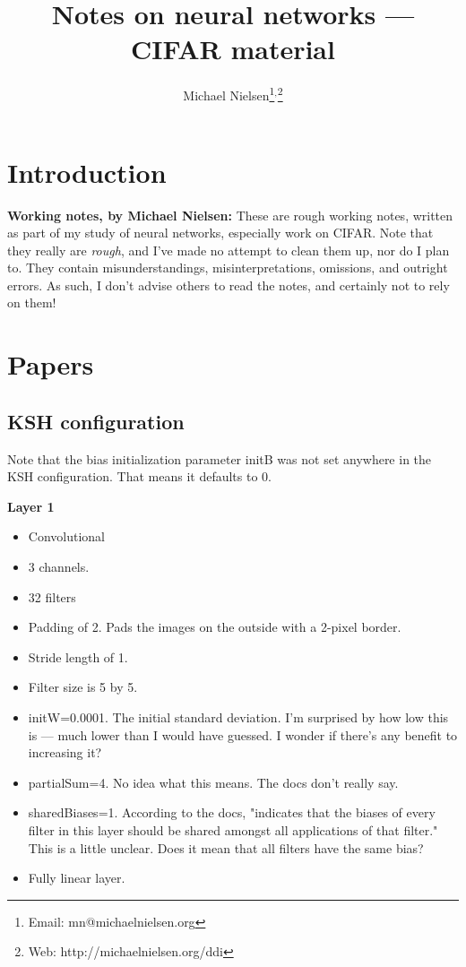 \documentclass[12pt]{report}
\begin{document}
\title{Notes on neural networks --- CIFAR material}
\author{Michael Nielsen\thanks{Email: mn@michaelnielsen.org}$^{,}$\thanks{Web: http://michaelnielsen.org/ddi}}

\maketitle

\chapter{Introduction}

\textbf{Working notes, by Michael Nielsen:} These are rough working
notes, written as part of my study of neural networks, especially work
on CIFAR.  Note that they really are \emph{rough}, and I've made no
attempt to clean them up, nor do I plan to.  They contain
misunderstandings, misinterpretations, omissions, and outright errors.
As such, I don't advise others to read the notes, and certainly not to
rely on them!

\chapter{Papers}

\section{KSH configuration}


Note that the bias initialization parameter initB was not set anywhere
in the KSH configuration.  That means it defaults to 0.

\textbf{Layer 1}
\begin{itemize}
\item Convolutional
\item 3 channels.  
\item 32 filters
\item Padding of 2.  Pads the images on the outside with a 2-pixel border.
\item Stride length of 1.
\item Filter size is 5 by 5.
\item initW=0.0001.  The initial standard deviation.  I'm surprised by how
  low this is --- much lower than I would have guessed.  I wonder if
  there's any benefit to increasing it?
\item partialSum=4.  No idea what this means.  The docs don't really say.
\item sharedBiases=1.  According to the docs, "indicates that the biases
  of every filter in this layer should be shared amongst all
  applications of that filter."  This is a little unclear.  Does it
  mean that all filters have the same bias?
\item Fully linear layer.
\end{itemize}
\end{document}

